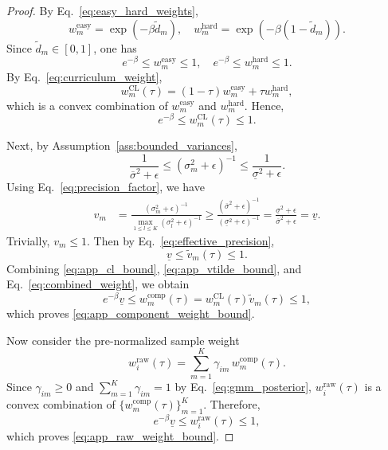 \documentclass[10pt,a4paper]{amsart}
\begin{document}
\begin{proof}
	By Eq.~\eqref{eq:easy_hard_weights},
	\[
	w_m^{\mathrm{easy}}=\exp(-\beta\tilde d_m),
	\quad
	w_m^{\mathrm{hard}}=\exp(-\beta(1-\tilde d_m)).
	\]
	Since $\tilde d_m\in[0,1]$, one has
	\begin{equation}
		e^{-\beta}\leqslant w_m^{\mathrm{easy}}\leqslant 1,
		\quad
		e^{-\beta}\leqslant w_m^{\mathrm{hard}}\leqslant 1.
		\label{eq:app_easy_hard_bound}
	\end{equation}
	By Eq.~\eqref{eq:curriculum_weight},
	\[
	w_m^{\mathrm{CL}}(\tau)
	=
	(1-\tau)w_m^{\mathrm{easy}}
	+
	\tau w_m^{\mathrm{hard}},
	\]
	which is a convex combination of
	$w_m^{\mathrm{easy}}$ and $w_m^{\mathrm{hard}}$.
	Hence,
	\begin{equation}
		e^{-\beta}\leqslant w_m^{\mathrm{CL}}(\tau)\leqslant 1.
		\label{eq:app_cl_bound}
	\end{equation}
	
	Next, by Assumption~\ref{ass:bounded_variances},
	\begin{equation}
		\frac{1}{\overline{\sigma}^{2}+\epsilon}
		\leqslant
		(\sigma_m^{2}+\epsilon)^{-1}
		\leqslant
		\frac{1}{\underline{\sigma}^{2}+\epsilon}.
		\label{eq:app_inverse_variance_bound}
	\end{equation}
	Using Eq.~\eqref{eq:precision_factor}, we have
	\begin{align}
		v_m
		&=
		\frac{(\sigma_m^{2}+\epsilon)^{-1}}
		{\max_{1\leqslant l\leqslant K}(\sigma_l^{2}+\epsilon)^{-1}}
		\geqslant
		\frac{(\overline{\sigma}^{2}+\epsilon)^{-1}}
		{(\underline{\sigma}^{2}+\epsilon)^{-1}}
		=
		\frac{\underline{\sigma}^{2}+\epsilon}
		{\overline{\sigma}^{2}+\epsilon}
		=
		\underline{v}.
		\label{eq:app_vm_lower}
	\end{align}
	Trivially, $v_m\leqslant 1$. Then by Eq.~\eqref{eq:effective_precision},
	\begin{equation}
		\underline{v}\leqslant \tilde v_m(\tau)\leqslant 1.
		\label{eq:app_vtilde_bound}
	\end{equation}
	Combining \eqref{eq:app_cl_bound},
	\eqref{eq:app_vtilde_bound}, and
	Eq.~\eqref{eq:combined_weight}, we obtain
	\[
	e^{-\beta}\underline{v}
	\leqslant
	w_m^{\mathrm{comp}}(\tau)
	=
	w_m^{\mathrm{CL}}(\tau)\tilde v_m(\tau)
	\leqslant
	1,
	\]
	which proves \eqref{eq:app_component_weight_bound}.
	
	Now consider the pre-normalized sample weight
	\[
	w_i^{\mathrm{raw}}(\tau)
	=
	\sum_{m=1}^{K}\gamma_{im}\,w_m^{\mathrm{comp}}(\tau).
	\]
	Since $\gamma_{im}\geqslant 0$ and
	$\sum_{m=1}^{K}\gamma_{im}=1$ by Eq.~\eqref{eq:gmm_posterior},
	$w_i^{\mathrm{raw}}(\tau)$ is a convex combination of
	$\{w_m^{\mathrm{comp}}(\tau)\}_{m=1}^{K}$.
	Therefore,
	\[
	e^{-\beta}\underline{v}
	\leqslant
	w_i^{\mathrm{raw}}(\tau)
	\leqslant
	1,
	\]
	which proves \eqref{eq:app_raw_weight_bound}.
	

\end{proof}
\end{document}
